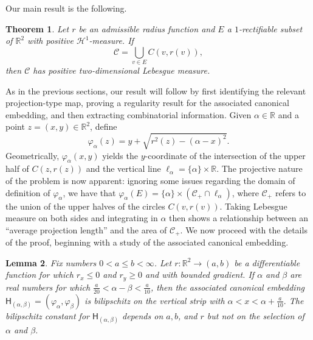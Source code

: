 \documentclass[12pt]{amsart}
\newtheorem{theorem}{Theorem}[section]
\newtheorem{lemma}[theorem]{Lemma}
\theoremstyle{definition}
\numberwithin{equation}{section}
\newcommand{\R}{\mathbb{R}}
\begin{document}
\noindent Our main result is the following.

\begin{theorem}\label{thm:main_circle_union_result}
Let $r$ be an admissible radius function and $E$ a $1$-rectifiable subset of $\mathbb{R}^2$ with positive $\mathcal{H}^1$-measure. If 
$$\mathcal{C} = \bigcup_{v \in E} C(v, r(v)),$$
then $\mathcal{C}$ has positive two-dimensional Lebesgue measure.
\end{theorem}


As in the previous sections, our result will follow by first identifying the relevant projection-type map, proving a regularity result for the associated canonical embedding, and then extracting combinatorial information. Given $\alpha\in \R$ and a point $z = (x, y)\in \R^2$, define
$$\varphi_{\alpha}(z) = y + \sqrt{r^2(z) - (\alpha - x)^2}.$$
Geometrically, $\varphi_{\alpha}(x, y)$ yields the $y$-coordinate of the intersection of the upper half of $C(z, r(z))$ and the vertical line $\ell_{\alpha} = \{\alpha\} \times \mathbb{R}$. The projective nature of the problem is now apparent: ignoring some issues regarding the domain of definition of $\varphi_{\alpha}$, we have that $\varphi_{\alpha}(E) = \{\alpha\} \times (\mathcal{C}_+ \cap \ell_{\alpha})$, where $\mathcal{C}_+$ refers to the union of the upper halves of the circles $C(v, r(v))$. Taking Lebesgue measure on both sides and integrating in $\alpha$ then shows a relationship between an ``average projection length'' and the area of $\mathcal{C}_+$. We now proceed with the details of the proof, beginning with a study of the associated canonical embedding.

\begin{lemma} \label{lemma:circles_canonical_embedding}
    Fix numbers $0 < a \le b < \infty$. Let $r : \mathbb{R}^2 \to (a, b)$ be a differentiable function for which $r_x \le 0$ and $r_y \ge 0$ and with bounded gradient. If $\alpha$ and $\beta$ are real numbers for which $\frac{a}{20} < \alpha - \beta < \frac{a}{10}$, then the associated canonical embedding $\mathsf{H}_{(\alpha, \beta)} = (\varphi_{\alpha}, \varphi_{\beta})$ is bilipschitz on the vertical strip with $\alpha < x < \alpha + \frac a {10}.$ The bilipschitz constant for $\mathsf{H}_{(\alpha, \beta)}$ depends on $a, b$, and $r$ but not on the selection of $\alpha$ and $\beta$.
\end{lemma}
\end{document}

